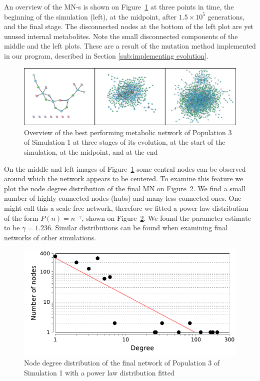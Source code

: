 \documentclass[a4paper,12pt]{article}
\begin{document}
An overview of the MN-s is shown on Figure~\ref{fig:init-mid-final} at three points in time, the beginning of the simulation (left), at the midpoint, after $1.5\times 10^5$ generations, and the final stage. The disconnected nodes at the bottom of the left plot are yet unused internal metabolites. Note the small disconnected components of the middle and the left plots. These are a result of the mutation method implemented in our program, described in Section \ref{sub:implementing evolution}. 

\begin{figure}[htpb]
	\centering
	\includegraphics[width=1\linewidth]{init-mid-final.png}
	\caption{Overview of the best performing metabolic network of Population 3 of Simulation 1 at three stages of its evolution, at the start of the simulation, at the midpoint, and at the end}
	\label{fig:init-mid-final}
\end{figure}

On the middle and left images of Figure~\ref{fig:init-mid-final} some central nodes can be observed around which the network appears to be centered. To examine this feature we plot the node degree distribution of the final MN on Figure~\ref{fig:nodedegreedistro}. We find a small number of highly connected nodes (hubs) and many less connected ones. One might call this a scale free network, therefore we fitted a power law distribution of the form $P(n)=n^{-\gamma}$, shown on Figure~\ref{fig:nodedegreedistro}. We found the parameter estimate to be $\gamma=1.236$. Similar distributions can be found when examining final networks of other simulations. 





\begin{figure}[htpb]
	\centering
	\includegraphics[width=0.8\linewidth]{nodedegreedistro.pdf}
	\caption{Node degree distribution of the final network of Population 3 of Simulation 1 with a power law distribution fitted}
	\label{fig:nodedegreedistro}
\end{figure}
\end{document}
